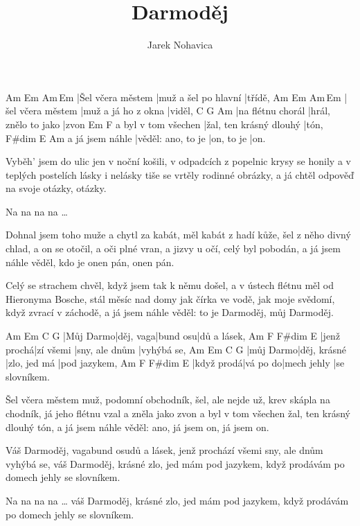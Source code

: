 \documentclass{song}
\author{Jarek Nohavica}
\title{Darmoděj}
\begin{document}
\begin{multicols}{2}

\strophe
Am                Em                   Am\,Em
|Šel včera městem |muž a šel po hlavní |třídě,
Am                Em                  Am\,Em
|šel včera městem |muž a já ho z okna |viděl,
C                 G                    Am
|na flétnu chorál |hrál, znělo to jako |zvon
                    Em                      F
a byl v tom všechen |žal, ten krásný dlouhý |tón,
                F\#dim             E          Am
a já jsem náhle |věděl: ano, to je |on, to je |on.
\endstrophe

\strophe*
Vyběh' jsem do ulic jen v noční košili,
v odpadcích z popelnic krysy se honily
a v teplých postelích lásky i nelásky
tiše se vrtěly rodinné obrázky,
a já chtěl odpověď na svoje otázky, otázky.
\endstrophe

Na na na na \ldots
\endstrophe

\strophe*
Dohnal jsem toho muže a chytl za kabát,
měl kabát z hadí kůže, šel z něho divný chlad,
a on se otočil, a oči plné vran,
a jizvy u očí, celý byl pobodán,
a já jsem náhle věděl, kdo je onen pán, onen pán.
\endstrophe

\strophe*
Celý se strachem chvěl, když jsem tak k němu došel,
a v ústech flétnu měl od Hieronyma Bosche,
stál měsíc nad domy jak čírka ve vodě,
jak moje svědomí, když zvrací v záchodě,
a já jsem náhle věděl: to je Darmoděj, můj Darmoděj.
\endstrophe

\columnbreak

Am        Em        C        G
|Můj Darmo|děj, vaga|bund osu|dů a lásek,
Am          F         F\#dim         E\7
|jenž prochá|zí všemi |sny, ale dnům |vyhýbá se,
Am        Em           C            G
|můj Darmo|děj, krásné |zlo, jed má |pod jazykem,
Am         F        F\#dim      E\7
|když prodá|vá po do|mech jehly |se slovníkem.
\endstrophe

\strophe*
Šel včera městem muž, podomní obchodník,
šel, ale nejde už, krev skápla na chodník,
já jeho flétnu vzal a zněla jako zvon
a byl v tom všechen žal, ten krásný dlouhý tón,
a já jsem náhle věděl: ano, já jsem on, já jsem on.
\endstrophe

Váš Darmoděj, vagabund osudů a lásek,
jenž prochází všemi sny, ale dnům vyhýbá se,
váš Darmoděj, krásné zlo, jed mám pod jazykem,
když prodávám po domech jehly se slovníkem.
\endstrophe

Na na na na \ldots
váš Darmoděj, krásné zlo, jed mám pod jazykem,
když prodávám po domech jehly se slovníkem.
\endstrophe

\end{multicols}
\end{document}
